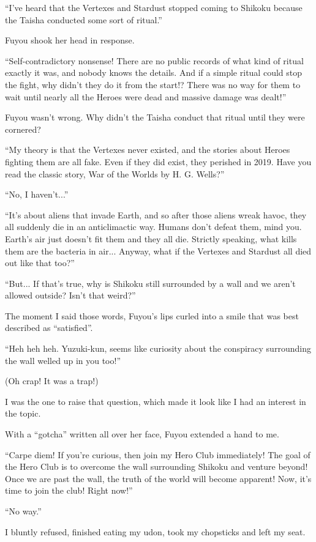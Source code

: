 ``I've heard that the Vertexes and Stardust stopped coming to Shikoku because the Taisha conducted some sort of ritual.''

Fuyou shook her head in response.

``Self-contradictory nonsense! There are no public records of what kind of ritual exactly it was, and nobody knows the details. And if a simple ritual could stop the fight, why didn't they do it from the start!? There was no way for them to wait until nearly all the Heroes were dead and massive damage was dealt!''

Fuyou wasn't wrong. Why didn't the Taisha conduct that ritual until they were cornered?

``My theory is that the Vertexes never existed, and the stories about Heroes fighting them are all fake. Even if they did exist, they perished in 2019. Have you read the classic story, War of the Worlds by H. G. Wells?''

``No, I haven't...''

``It's about aliens that invade Earth, and so after those aliens wreak havoc, they all suddenly die in an anticlimactic way. Humans don't defeat them, mind you. Earth's air just doesn't fit them and they all die. Strictly speaking, what kills them are the bacteria in air... Anyway, what if the Vertexes and Stardust all died out like that too?''

``But... If that's true, why is Shikoku still surrounded by a wall and we aren't allowed outside? Isn't that weird?''

The moment I said those words, Fuyou's lips curled into a smile that was best described as ``satisfied''.

``Heh heh heh. Yuzuki-kun, seems like curiosity about the conspiracy surrounding the wall welled up in you too!''

(Oh crap! It was a trap!)

I was the one to raise that question, which made it look like I had an interest in the topic.

With a ``gotcha'' written all over her face, Fuyou extended a hand to me.

``Carpe diem! If you're curious, then join my Hero Club immediately! The goal of the Hero Club is to overcome the wall surrounding Shikoku and venture beyond! Once we are past the wall, the truth of the world will become apparent! Now, it's time to join the club! Right now!''

``No way.''

I bluntly refused, finished eating my udon, took my chopsticks and left my seat.


